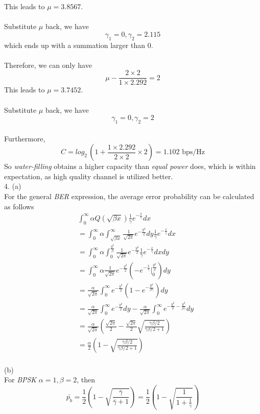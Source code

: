 \documentclass [12pt] {article}
\begin{document}
\begin{spacing}{1.5}
This leads to $\mu = 3.8567$.\\
~\\
Substitute $\mu$ back, we have $$\gamma_1 =0, \gamma_2 = 2.115$$
which ends up with a summation larger than 0. \\
~\\
Therefore, we can only have $$ \mu -  \frac{2\times 2}{1\times 2.292} = 2$$
This leads to $\mu = 3.7452$.\\
~\\
Substitute $\mu$ back, we have $$\gamma_1 =0, \gamma_2 = 2$$\\
Furthermore, $$ C = log_2 \, (1+ \frac{1\times 2.292}{2\times2}\times 2) = 1.102 \text{ bps/Hz}$$
So \emph{water-filling} obtains a higher capacity than \emph{equal power} does, which is within expectation, as high quality channel is utilized better.  \\
4. (a)\\
For the general \emph{BER} expression, the average error probability can be calculated as follows
\begin{align*}
&\int_0^\infty \alpha Q(\sqrt{\beta x}) \frac{1}{\bar\gamma}e^{-\frac{x}{\bar\gamma}}dx\\
& = \int_0^\infty \alpha \int_{\sqrt{\beta x}}^\infty \frac{1}{\sqrt{2\pi}}e^{-\frac{y^2}{2}}dy\frac{1}{\bar\gamma}e^{-\frac{x}{\bar\gamma}}dx\\
&= \int_0^\infty \alpha \int_0^{\frac{y^2}{\beta}}\frac{1}{\sqrt{2\pi}}e^{-\frac{y^2}{2}}\frac{1}{\bar\gamma}e^{-\frac{x}{\bar\gamma}}dxdy\\
&= \int_0^\infty \alpha \frac{1}{\sqrt{2\pi}}e^{-\frac{y^2}{2}}(-e^{-\frac{x}{\bar\gamma}}\big|_0^{\frac{y^2}{\beta}})dy\\
&= \frac{\alpha}{\sqrt{2\pi}}\int_0^\infty e^{-\frac{y^2}{2}}(1-e^{-\frac{y^2}{\beta \bar\gamma}})dy\\
& = \frac{\alpha}{\sqrt{2\pi}}\int_0^\infty e^{-\frac{y^2}{2}}dy - \frac{\alpha}{\sqrt{2\pi}}\int_0^\infty e^{-\frac{y^2}{2}-\frac{y^2}{\beta \bar\gamma}}dy\\
&=\frac{\alpha}{\sqrt{2\pi}}(\frac{\sqrt{2\pi}}{2} - \frac{\sqrt{2\pi}}{2}\sqrt{\frac{\bar\gamma\beta/2}{\bar\gamma\beta/2 +1}})\\
& = \frac{\alpha}{2}(1- \sqrt{\frac{\bar\gamma\beta/2}{\bar\gamma\beta/2 +1}})
\end{align*}
~\\
(b)\\
For \emph{BPSK} $\alpha = 1, \beta = 2$, then $$ \bar{p_b} = \frac{1}{2}(1-\sqrt{\frac{\bar\gamma}{\bar\gamma +1}}) = \frac{1}{2}(1-\sqrt{\frac{1}{1+\frac{1}{\bar\gamma}}})$$

\end{spacing}
\end{document}
